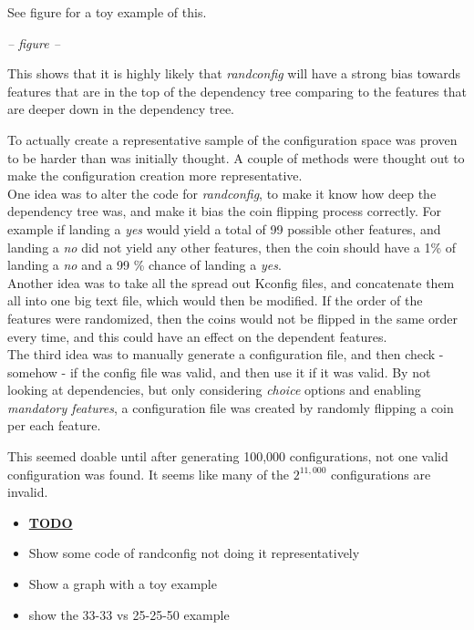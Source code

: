 \documentclass[a4paper,11pt]{article}
\begin{document}
See figure for a toy example of this.


\begin{center}
    \emph{-- figure --}
\end{center}


This shows that it is highly likely that \emph{randconfig} will have a strong 
bias towards features that are in the top of the dependency tree comparing to 
the features that are deeper down in the dependency tree. 

To actually create a representative sample of the configuration space was 
proven to be harder than was initially thought. A couple of methods were 
thought out to make the configuration creation more representative. \\


One idea was to alter the code for \emph{randconfig}, to make it know how deep 
the dependency tree was, and make it bias the coin flipping process correctly. 
For example if landing a \emph{yes} would yield a total of 99 possible other 
features, and landing a \emph{no} did not yield any other features, then the 
coin should have a 1\% of landing a \emph{no} and a 99 \% chance of landing a 
\emph{yes}. \\


Another idea was to take all the spread out Kconfig files, and concatenate 
them all into one big text file, which would then be modified. If the order of 
the features were randomized, then the coins would not be flipped in the same 
order every time, and this could have an effect on the dependent features. \\

The third idea was to manually generate a configuration file, and then check - 
somehow - if the config file was valid, and then use it if it was valid. By 
not looking at dependencies, but only considering \emph{choice} options and 
enabling \emph{mandatory features}, a configuration file was created by 
randomly flipping a coin per each feature.

This seemed doable until after generating 100,000 configurations, not one 
valid configuration was found. It seems like many of the $2^{11,000}$ 
configurations are invalid.


\begin{itemize}
    \item \underline{\textbf{TODO}}
    \item Show some code of randconfig not doing it representatively
    \item Show a graph with a toy example
    \item show the 33-33 vs 25-25-50 example
\end{itemize}
\end{document}
